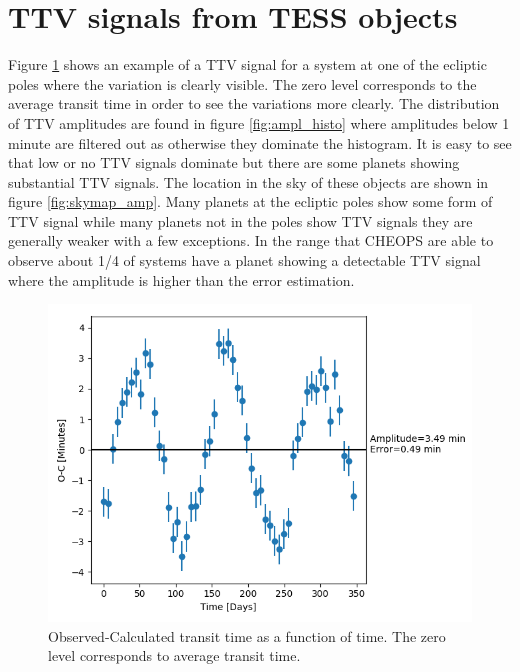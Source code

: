 \documentclass[12pt]{report}
\begin{document}
\section{TTV signals from TESS objects}
	Figure \ref{fig:TTV1} shows an example of a TTV signal for a system at one of the ecliptic poles where the variation is clearly visible. The zero level corresponds to the average transit time in order to see the variations more clearly. The distribution of TTV amplitudes are found in figure \ref{fig:ampl_histo} where amplitudes below 1 minute are filtered out as otherwise they dominate the histogram. It is easy to see that low or no TTV signals dominate but there are some planets showing substantial TTV signals. The location in the sky of these objects are shown in figure \ref{fig:skymap_amp}. Many planets at the ecliptic poles show some form of TTV signal while many planets not in the poles show TTV signals they are generally weaker with a few exceptions. In the range that CHEOPS are able to observe about 1/4 of systems have a planet showing a detectable TTV signal where the amplitude is higher than the error estimation.
\begin{figure}[h]
 	 \centering
	  \includegraphics[width=\textwidth]{img/232_1.png}
	  \caption{Observed-Calculated transit time as a function of time. The zero level corresponds to average transit time.}
	 \label{fig:TTV1}
\end{figure}
\end{document}
